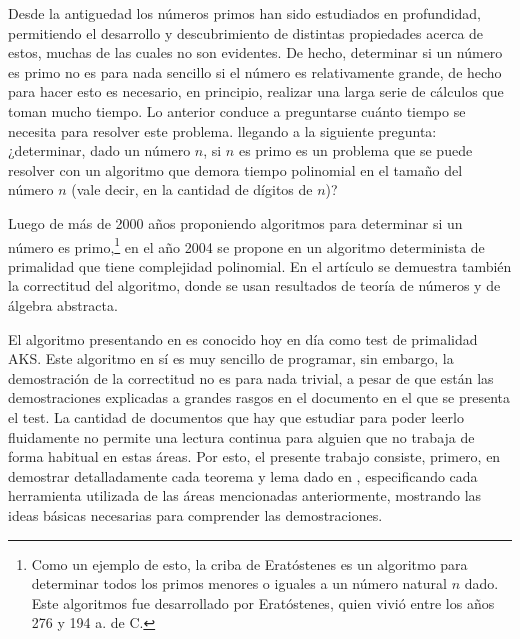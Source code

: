 

Desde la antiguedad los números primos han sido estudiados en
profundidad, permitiendo el desarrollo y descubrimiento de distintas
propiedades acerca de estos, muchas de las cuales no son evidentes.
De hecho, determinar si un número es primo no es para nada sencillo si
el número es relativamente grande, de hecho para hacer esto es
necesario, en principio, realizar una larga serie de cálculos que
toman mucho tiempo. Lo anterior conduce a preguntarse cuánto tiempo
se necesita para resolver este problema.
llegando a la siguiente pregunta:
¿determinar, dado un número $n$, si $n$ es primo es
un problema que se puede resolver con un algoritmo que demora tiempo
polinomial en el tamaño del número $n$ (vale decir, en la cantidad de
dígitos de $n$)?
    
        Luego de más de 2000 años proponiendo algoritmos para determinar si un número es primo,\footnote{Como un ejemplo de esto, la criba de Eratóstenes es un algoritmo para determinar todos los primos menores o iguales a un número natural $n$  dado. Este algoritmos fue desarrollado por Eratóstenes, quien vivió entre los años  276 y 194 a. de C.} en el año 2004 se propone
    en 
    \cite{AKS04}
    un algoritmo determinista de primalidad que tiene complejidad polinomial. En 
    el artículo se demuestra también la correctitud del algoritmo, donde se usan resultados de teorí­a de números y de álgebra abstracta. 
    
    El algoritmo presentando en \cite{AKS04} es conocido hoy en día como test de primalidad AKS. Este algoritmo en sí­ es muy sencillo de programar, sin embargo, la demostración de la correctitud no es para nada trivial, a pesar de que están las demostraciones explicadas a grandes rasgos en el documento en el que se presenta el test. La cantidad de documentos que hay que estudiar para poder leerlo fluidamente no permite una lectura continua para alguien que no 
    trabaja de forma habitual en estas áreas. Por esto, 
    el presente trabajo consiste, primero, en demostrar detalladamente cada teorema y lema dado en \cite{AKS04},
    especificando cada herramienta utilizada de las áreas mencionadas anteriormente, mostrando las ideas básicas necesarias para comprender las demostraciones.

